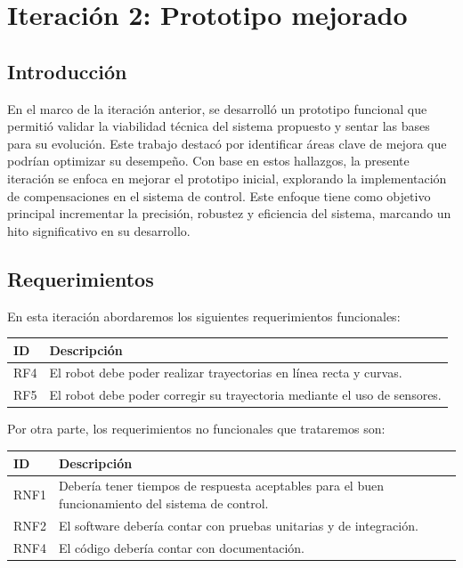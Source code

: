 \newpage
\section{Iteración 2: Prototipo mejorado}

\subsection{Introducción}
En el marco de la iteración anterior, se desarrolló un prototipo funcional que permitió validar la viabilidad técnica del sistema propuesto y sentar las bases para su evolución. Este trabajo destacó por identificar áreas clave de mejora que podrían optimizar su desempeño. Con base en estos hallazgos, la presente iteración se enfoca en mejorar el prototipo inicial, explorando la implementación de compensaciones en el sistema de control. Este enfoque tiene como objetivo principal incrementar la precisión, robustez y eficiencia del sistema, marcando un hito significativo en su desarrollo.

\subsection{Requerimientos}
En esta iteración abordaremos los siguientes requerimientos funcionales:

\begin{center}
\begin{tabular}{
    | >{\centering\arraybackslash}m{1cm}
    | >{\centering\arraybackslash}m{13cm} |
}
\hline \rowcolor{test_header_color}
    ID & Descripción \\
\hline
    RF4 & El robot debe poder realizar trayectorias en línea recta y curvas. \\ 
\hline
    RF5 & El robot debe poder corregir su trayectoria mediante el uso de sensores. \\ 
\hline
\end{tabular}
\end{center}

Por otra parte, los requerimientos no funcionales que trataremos son:

\begin{center}
\begin{tabular}{
    | >{\centering\arraybackslash}m{1cm}
    | >{\centering\arraybackslash}m{13cm} |
}
\hline \rowcolor{test_header_color}
    ID & Descripción \\
\hline
    RNF1 & Debería tener tiempos de respuesta aceptables para el buen funcionamiento del sistema de control. \\
\hline
    RNF2 & El software debería contar con pruebas unitarias y de integración. \\
\hline
    RNF4 & El código debería contar con documentación.\\
\hline
\end{tabular}
\end{center}

